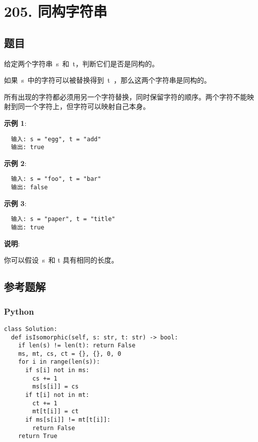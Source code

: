 \newpage
\section{205. 同构字符串}
\label{leetcode:205}

\subsection{题目}

给定两个字符串 s 和 t，判断它们是否是同构的。

如果 s 中的字符可以被替换得到 t ，那么这两个字符串是同构的。

所有出现的字符都必须用另一个字符替换，同时保留字符的顺序。两个字符不能映
射到同一个字符上，但字符可以映射自己本身。

\textbf{示例 1}:

\begin{verbatim}
  输入: s = "egg", t = "add"
  输出: true
\end{verbatim}

\textbf{示例 2}:

\begin{verbatim}
  输入: s = "foo", t = "bar"
  输出: false
\end{verbatim}

\textbf{示例 3}:

\begin{verbatim}
  输入: s = "paper", t = "title"
  输出: true
\end{verbatim}

\textbf{说明}:

你可以假设 s 和 t 具有相同的长度。

\subsection{参考题解}

\subsubsection{Python}

\begin{verbatim}
class Solution:
  def isIsomorphic(self, s: str, t: str) -> bool:
    if len(s) != len(t): return False
    ms, mt, cs, ct = {}, {}, 0, 0
    for i in range(len(s)):
      if s[i] not in ms:
        cs += 1
        ms[s[i]] = cs
      if t[i] not in mt:
        ct += 1
        mt[t[i]] = ct
      if ms[s[i]] != mt[t[i]]:
        return False
    return True
\end{verbatim}
